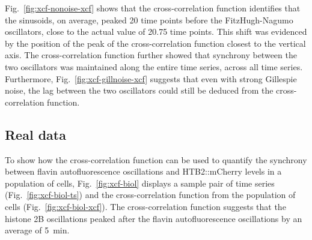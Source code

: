 Fig.\ \ref{fig:xcf-nonoise-xcf} shows that the cross-correlation function identifies that the sinusoids, on average, peaked 20 time points before the FitzHugh-Nagumo oscillators, close to the actual value of 20.75 time points.
This shift was evidenced by the position of the peak of the cross-correlation function closest to the vertical axis.
The cross-correlation function further showed that synchrony between the two oscillators was maintained along the entire time series, across all time series.
Furthermore, Fig.\ \ref{fig:xcf-gillnoise-xcf} suggests that even with strong Gillespie noise, the lag between the two oscillators could still be deduced from the cross-correlation function.


\subsection{Real data}
\label{subsubsec:analysis-correlation-real}

To show how the cross-correlation function can be used to quantify the synchrony between flavin autofluorescence oscillations and HTB2::mCherry levels in a population of cells, Fig.\ \ref{fig:xcf-biol} displays a sample pair of time series (Fig.\ \ref{fig:xcf-biol-ts}) and the cross-correlation function from the population of cells (Fig.\ \ref{fig:xcf-biol-xcf}).
The cross-correlation function suggests that the histone 2B oscillations peaked after the flavin autofluorescence oscillations by an average of \SI{5}{\minute}.

